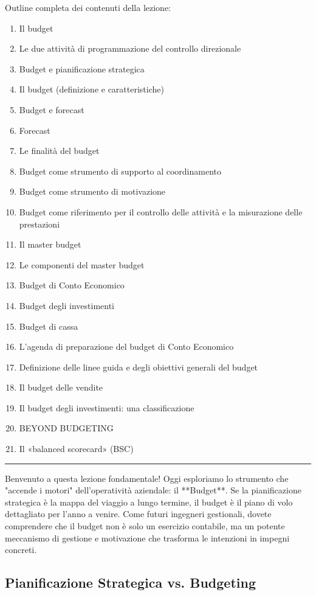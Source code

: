 \documentclass[a4paper,10pt]{article}
\begin{document}
Outline completa dei contenuti della lezione:
{\small
\begin{enumerate}
\item Il budget
\item Le due attività di programmazione del controllo direzionale
\item Budget e pianificazione strategica
\item Il budget (definizione e caratteristiche)
\item Budget e forecast
\item Forecast
\item Le finalità del budget
\item Budget come strumento di supporto al coordinamento
\item Budget come strumento di motivazione
\item Budget come riferimento per il controllo delle attività e la misurazione delle prestazioni
\item Il master budget
\item Le componenti del master budget
\item Budget di Conto Economico
\item Budget degli investimenti
\item Budget di cassa
\item L’agenda di preparazione del budget di Conto Economico
\item Definizione delle linee guida e degli obiettivi generali del budget
\item Il budget delle vendite
\item Il budget degli investimenti: una classificazione
\item BEYOND BUDGETING
\item Il «balanced scorecard» (BSC)
\end{enumerate}
}
\hrule
\vspace{0.5cm}

Benvenuto a questa lezione fondamentale! Oggi esploriamo lo strumento che "accende i motori" dell'operatività aziendale: il **Budget**. Se la pianificazione strategica è la mappa del viaggio a lungo termine, il budget è il piano di volo dettagliato per l'anno a venire. Come futuri ingegneri gestionali, dovete comprendere che il budget non è solo un esercizio contabile, ma un potente meccanismo di gestione e motivazione che trasforma le intenzioni in impegni concreti.

\subsection*{Pianificazione Strategica vs. Budgeting}
\end{document}
